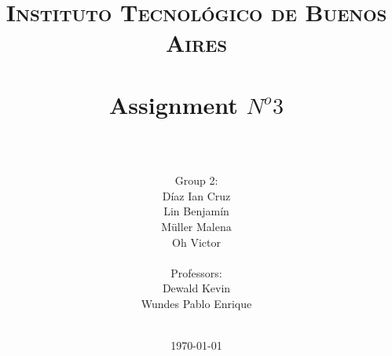 




\title{
	\normalfont \normalsize \textsc{Instituto Tecnológico de Buenos Aires} \\ [25pt]
	\horrule{2pt} \\[0.4cm]
	\huge Assignment $N^o 3$ \\
	\horrule{2pt} \\[0cm]
\author{Group 2:\\Díaz Ian Cruz\\Lin Benjamín\\ Müller Malena\\Oh Victor \\ \\ Professors:\\Dewald Kevin\\Wundes Pablo Enrique\\ \\}
}
\date{\today} %

\maketitle
\newpage








%



